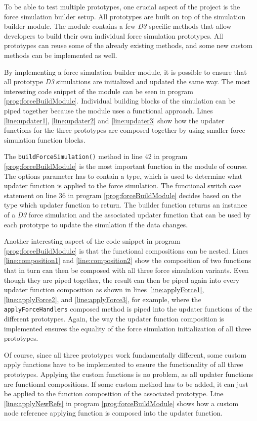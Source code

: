To be able to test multiple prototypes, one crucial aspect of the project is the force simulation builder setup. All prototypes are built on top of the simulation builder module. The module contains a few \emph{D3} specific methods that allow developers to build their own individual force simulation prototypes. All prototypes can reuse some of the already existing methods, and some new custom methods can be implemented as well.

By implementing a force simulation builder module, it is possible to ensure that all prototype \emph{D3} simulations are initialized and updated the same way. The most interesting code snippet of the module can be seen in program \ref{prog:forceBuildModule}. Individual building blocks of the simulation can be piped together because the module uses a functional approach. Lines \ref{line:updater1}, \ref{line:updater2} and \ref{line:updater3} show how the updater functions for the three prototypes are composed together by using smaller force simulation function blocks.

The \texttt{buildForceSimulation()} method in line 42 in program \ref{prog:forceBuildModule} is the most important function in the module of course. The options parameter has to contain a type, which is used to determine what updater function is applied to the force simulation. The functional switch case statement on line 36 in program \ref{prog:forceBuildModule} decides based on the type which updater function to return. The builder function returns an instance of a \emph{D3} force simulation and the associated updater function that can be used by each prototype to update the simulation if the data changes.

Another interesting aspect of the code snippet in program \ref{prog:forceBuildModule} is that the functional compositions can be nested. Lines \ref{line:composition1} and \ref{line:composition2} show the composition of two functions that in turn can then be composed with all three force simulation variants. Even though they are piped together, the result can then be piped again into every updater function composition as shown in lines \ref{line:applyForce1}, \ref{line:applyForce2}, and \ref{line:applyForce3}, for example, where the \texttt{applyForceHandlers} composed method is piped into the updater functions of the different prototypes. Again, the way the updater function composition is implemented ensures the equality of the force simulation initialization of all three prototypes.

Of course, since all three prototypes work fundamentally different, some custom apply functions have to be implemented to ensure the functionality of all three prototypes. Applying the custom functions is no problem, as all updater functions are functional compositions. If some custom method has to be added, it can just be applied to the function composition of the associated prototype. Line \ref{line:applyNewRefs} in program \ref{prog:forceBuildModule} shows how a custom node reference applying function is composed into the updater function.

